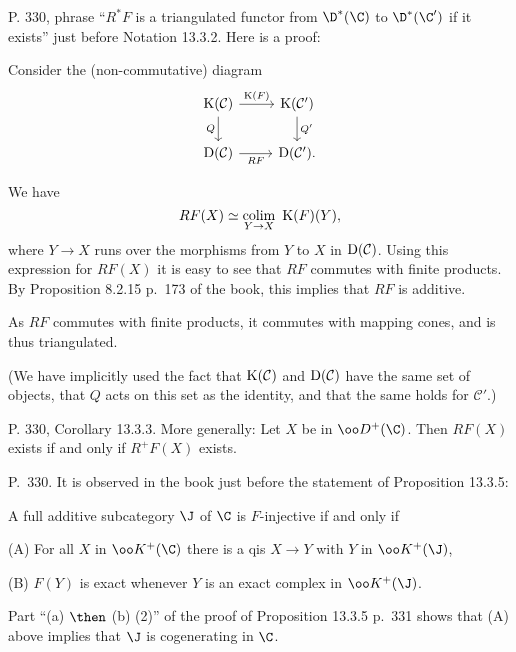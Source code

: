 \documentclass[12pt]{article}
\theoremstyle{remark}
\theoremstyle{definition}
\begin{document}
\begin{s}
P. 330, phrase ``$R^*F$ is a triangulated functor from $\D^*(\C)$ to $\D^*(\C')$ if it exists'' just before Notation 13.3.2. Here is a proof:

Consider the (non-commutative) diagram
$$
\begin{tikzcd}
\text K(\mathcal C)\ar[d,"Q"']\ar[r,"\text K(F)"]&\text K(\mathcal C')\ar[d,"Q'"]\\ 
\text D(\mathcal C)\ar[r,"RF"']&\text D(\mathcal C').
\end{tikzcd}
$$

We have 
$$
RF(X)\simeq\operatorname*{colim}_{Y\to X}\ \text K(F)(Y),
$$ 
where $Y\to X$ runs over the morphisms from $Y$ to $X$ in $\text D(\mathcal C)$. Using this expression for $RF(X)$ it is easy to see that $RF$ commutes with finite products. By Proposition 8.2.15 p.~173 of the book, this implies that $RF$ is additive. 

As $RF$ commutes with finite products, it commutes with mapping cones, and is thus triangulated.

(We have implicitly used the fact that $\text K(\mathcal C)$ and $\text D(\mathcal C)$ have the same set of objects, that $Q$ acts on this set as the identity, and that the same holds for $\mathcal C'$.)
\end{s}

%

\begin{s}
P. 330, Corollary 13.3.3. More generally: Let $X$ be in $\oo D^+(\C)$. Then $RF(X)$ exists if and only if $R^+F(X)$ exists.
\end{s}

%

\begin{s}
P.~330. It is observed in the book just before the statement of Proposition 13.3.5:

A full additive subcategory $\J$ of $\C$ is $F$-injective if and only if 

\nn(A) For all $X$ in $\oo K^+(\C)$ there is a qis $X\to Y$ with $Y$ in $\oo K^+(\J)$,

\nn(B) $F(Y)$ is exact whenever $Y$ is an exact complex in $\oo K^+(\J)$.

Part ``(a) $\then$ (b) (2)'' of the proof of Proposition 13.3.5 p.~331 shows that (A) above implies that $\J$ is cogenerating in $\C$.
\end{s}
\end{document}
